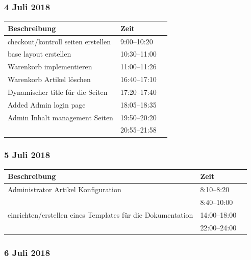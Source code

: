\documentclass[a4paper, 11pt]{article}
\begin{document}
\subsubsection{4 Juli 2018}

\begin{tabular}{llr}
\toprule
Beschreibung & Zeit \\
\midrule
checkout/kontroll seiten erstellen & 9:00--10:20 \\
base layout erstellen & 10:30--11:00 \\
Warenkorb implementieren & 11:00--11:26 \\
Warenkorb Artikel löschen & 16:40--17:10 \\
Dynamischer title für die Seiten & 17:20--17:40 \\
Added Admin login page & 18:05--18:35 \\
Admin Inhalt management Seiten & 19:50--20:20 \\
 & 20:55--21:58 \\
\bottomrule
\end{tabular}

\subsubsection{5 Juli 2018}

\begin{tabular}{llr}
\toprule
Beschreibung & Zeit \\
\midrule
Administrator Artikel Konfiguration & 8:10--8:20 \\
 & 8:40--10:00 \\
einrichten/erstellen eines Templates für die Dokumentation & 14:00--18:00 \\
 & 22:00--24:00 \\
\bottomrule
\end{tabular}

\subsubsection{6 Juli 2018}
\end{document}
